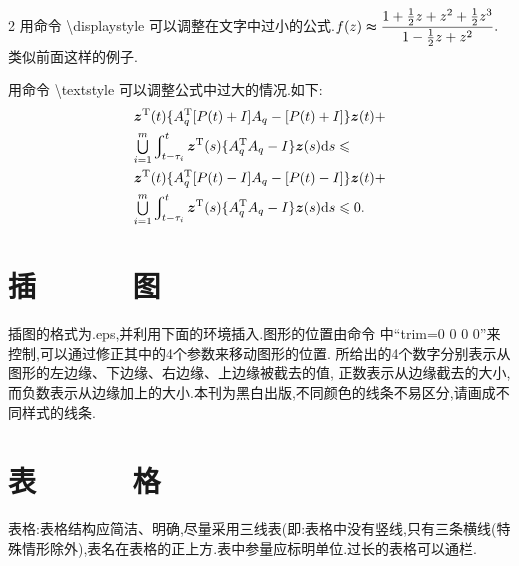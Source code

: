 \documentclass[authordraft]{ctacn}%
\begin{document}
\begin{multicols}{2}
用命令 \textbackslash displaystyle  可以调整在文字中过小的公式.\;$f(z)\thickapprox{\displaystyle\frac{1+\frac{1}{2}z+z^2+\frac{1}{2}z^3}{1-\frac{1}{2}z+z^2}}.$
类似前面这样的例子.

用命令 \textbackslash textstyle 可以调整公式中过大的情况.\;如下:
\begin{align}
&{\bm z}^{\rm T}(t)\{A_q^{\rm T}[P(t)+I]A_q-[P(t)+I]\}{\bm z}(t)+ \notag\\
&{\textstyle\bigcup\limits_{i=1}^m}\varint\nolimits_{t-\tau_i}^t{\bm
	z}^{\rm T}(s)\{A_q^{\rm T}A_q-I\}{\bm z}(s){\rm d}s\leqslant \notag\\
&{\bm z}^{\rm T}(t)\{A_q^{\rm T}[P(t)-I]A_q-[P(t)-I]\}{\bm z}(t)+ \notag\\
&{\textstyle\bigcup\limits_{i=1}^m}\varint\nolimits_{t-\tau_i}^t{\bm
	z}^{\rm T}(s)\{A_q^{\rm T}A_q-I\}{\bm z}(s){\rm d}s\leqslant 0.
\end{align}

\section{插~~~~~~图}

插图的格式为.eps,并利用下面的环境插入.图形的位置由命令
中“trim=0 0 0 0”来控制,可以通过修正其中的4个参数来移动图形的位置.
所给出的4个数字分别表示从图形的左边缘、下边缘、右边缘、上边缘被截去的值,
正数表示从边缘截去的大小, 而负数表示从边缘加上的大小.\;本刊为黑白出版,不同颜色的线条不易区分,请画成不同样式的线条.






\section{表~~~~~~格}
表格:表格结构应简洁、明确,尽量采用三线表(即:表格中没有竖线,只有三条横线(特殊情形除外),表名在表格的正上方.\;表中参量应标明单位.\;过长的表格可以通栏.

\end{multicols}
\end{document}
